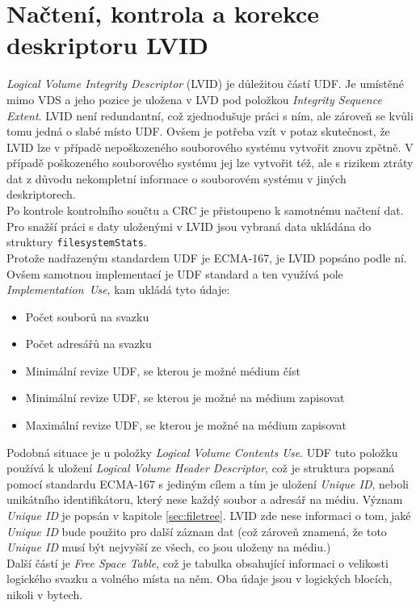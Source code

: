 \section{Načtení, kontrola a korekce deskriptoru LVID}
\label{sec:nacteni-a-oprava-lvid}
\textit{Logical Volume Integrity Descriptor} (LVID) je důležitou částí UDF. Je umístěné mimo VDS a jeho pozice je uložena v LVD pod položkou \textit{Integrity Sequence Extent}. LVID není redundantní, což zjednodušuje práci s ním, ale zároveň se kvůli tomu jedná o slabé místo UDF. Ovšem je potřeba vzít v potaz skutečnost, že LVID lze v případě nepoškozeného souborového systému vytvořit znovu zpětně. V případě poškozeného souborového systému jej lze vytvořit též, ale s rizikem ztráty dat z důvodu nekompletní informace o souborovém systému v jiných deskriptorech.\\
Po kontrole kontrolního součtu a CRC je přistoupeno k samotnému načtení dat. Pro snažší práci s daty uloženými v LVID jsou vybraná data ukládána do struktury \texttt{filesystemStats}.\\
Protože nadřazeným standardem UDF je ECMA-167, je LVID popsáno podle ní. Ovšem samotnou implementací je UDF standard a ten využívá pole \textit{Implementation~Use}, kam ukládá tyto údaje:
\begin{itemize}
    \item Počet souborů na svazku
    \item Počet adresářů na svazku
    \item Minimální revize UDF, se kterou je možné médium číst
    \item Minimální revize UDF, se kterou je možné na médium zapisovat
    \item Maximální revize UDF, se kterou je možné na médium zapisovat
\end{itemize}
Podobná situace je u položky \textit{Logical Volume Contents Use}. UDF tuto položku používá k uložení \textit{Logical Volume Header Descriptor}, což je struktura popsaná pomocí standardu ECMA-167 s jediným cílem a tím je uložení \textit{Unique ID}, neboli unikátního identifikátoru, který nese každý soubor a adresář na médiu. Význam \textit{Unique ID} je popsán v kapitole \ref{sec:filetree}. LVID zde nese informaci o tom, jaké \textit{Unique ID} bude použito pro další záznam dat (což zároveň znamená, že toto \textit{Unique ID} musí být nejvyšší ze všech, co jsou uloženy na médiu.)\\
Další částí je \textit{Free Space Table}, což je tabulka obsahující informaci o velikosti logického svazku a volného místa na něm. Oba údaje jsou v logických blocích, nikoli v bytech.\\
